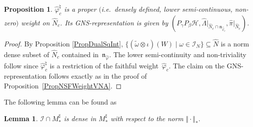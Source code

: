 \documentclass[11pt]{article}
\numberwithin{equation}{section}
\newtheorem{prop}[thm]{Proposition}
\newtheorem{lem}[thm]{Lemma}
\theoremstyle{definition}
\newcommand{\cHil}{\mathcal{H}}
\begin{document}
\begin{prop}\label{PropNSFWeightReduced}
 $\hat{\varphi}_c^\natural$  is a   proper $($i.e.\ densely defined, lower semi-continuous, non-zero$)$ weight on $\hat{N}_c$. Its GNS-representation is given by $(P_\gamma P_\beta \cHil, \hat{\Lambda} \vert_{\hat{N}_c \cap \mathfrak{n}_{\hat{\varphi}_c}}, \hat{\pi}\vert_{\hat{N}_c})$.
\end{prop}
\begin{proof}
By Proposition \ref{PropDualSqInt}, $\{ (\tilde{\omega} \otimes \iota)(W) \mid \omega \in \mathcal{I}_N \} \subseteq \hat{N}$ is a norm dense subset of $\hat{N}_c$ contained in~$\mathfrak{n}_{\hat{\varphi}}$. The lower semi-continuity and non-triviality  follow since  $\hat{\varphi}_c^\natural$ is a restriction of the faithful weight~$\hat{\varphi}_c$. The claim on the GNS-representation follows exactly as in the proof of Proposi\-tion~\ref{PropNSFWeightVNA}.
\end{proof}

The following lemma can be found as \cite[Lemma 4.2]{Kus}

\begin{lem}\label{LemDensity}
 $\mathcal{I} \cap M_\ast^\sharp$ is dense in $M_\ast^\sharp$ with respect to the norm $\Vert \cdot \Vert_\ast$.
\end{lem}
\end{document}
